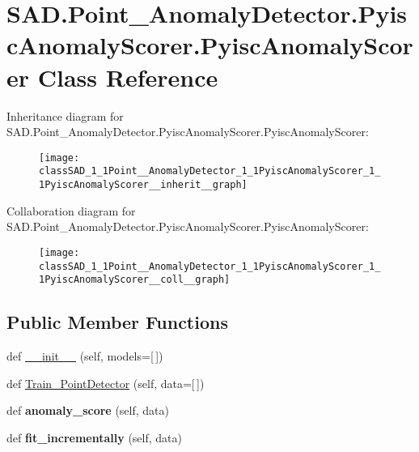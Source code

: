 \hypertarget{classSAD_1_1Point__AnomalyDetector_1_1PyiscAnomalyScorer_1_1PyiscAnomalyScorer}{}\section{S\+A\+D.\+Point\+\_\+\+Anomaly\+Detector.\+Pyisc\+Anomaly\+Scorer.\+Pyisc\+Anomaly\+Scorer Class Reference}
\label{classSAD_1_1Point__AnomalyDetector_1_1PyiscAnomalyScorer_1_1PyiscAnomalyScorer}


Inheritance diagram for S\+A\+D.\+Point\+\_\+\+Anomaly\+Detector.\+Pyisc\+Anomaly\+Scorer.\+Pyisc\+Anomaly\+Scorer\+:\nopagebreak
\begin{figure}[H]
\begin{center}
\leavevmode
\texttt{[image: classSAD\_1\_1Point\_\_AnomalyDetector\_1\_1PyiscAnomalyScorer\_1\_1PyiscAnomalyScorer\_\_inherit\_\_graph]}
\end{center}
\end{figure}


Collaboration diagram for S\+A\+D.\+Point\+\_\+\+Anomaly\+Detector.\+Pyisc\+Anomaly\+Scorer.\+Pyisc\+Anomaly\+Scorer\+:\nopagebreak
\begin{figure}[H]
\begin{center}
\leavevmode
\texttt{[image: classSAD\_1\_1Point\_\_AnomalyDetector\_1\_1PyiscAnomalyScorer\_1\_1PyiscAnomalyScorer\_\_coll\_\_graph]}
\end{center}
\end{figure}
\subsection*{Public Member Functions}
\begin{DoxyCompactItemize}
\item 
def \hyperlink{classSAD_1_1Point__AnomalyDetector_1_1PyiscAnomalyScorer_1_1PyiscAnomalyScorer_abc3bc5cec9cb7a036e27d38fd754a971}{\+\_\+\+\_\+init\+\_\+\+\_\+} (self, models=\mbox{[}$\,$\mbox{]})
\item 
def \hyperlink{classSAD_1_1Point__AnomalyDetector_1_1PyiscAnomalyScorer_1_1PyiscAnomalyScorer_ae27cbcb8c835a0fa016b9eafa4045052}{Train\+\_\+\+Point\+Detector} (self, data=\mbox{[}$\,$\mbox{]})
\item 
def {\bfseries anomaly\+\_\+score} (self, data)\hypertarget{classSAD_1_1Point__AnomalyDetector_1_1PyiscAnomalyScorer_1_1PyiscAnomalyScorer_a351d3ad46171d21bbb74172fcb0de863}{}\label{classSAD_1_1Point__AnomalyDetector_1_1PyiscAnomalyScorer_1_1PyiscAnomalyScorer_a351d3ad46171d21bbb74172fcb0de863}

\item 
def {\bfseries fit\+\_\+incrementally} (self, data)\hypertarget{classSAD_1_1Point__AnomalyDetector_1_1PyiscAnomalyScorer_1_1PyiscAnomalyScorer_af97fea4a0d078209a68cb25516f9226a}{}\label{classSAD_1_1Point__AnomalyDetector_1_1PyiscAnomalyScorer_1_1PyiscAnomalyScorer_af97fea4a0d078209a68cb25516f9226a}

\end{DoxyCompactItemize}
